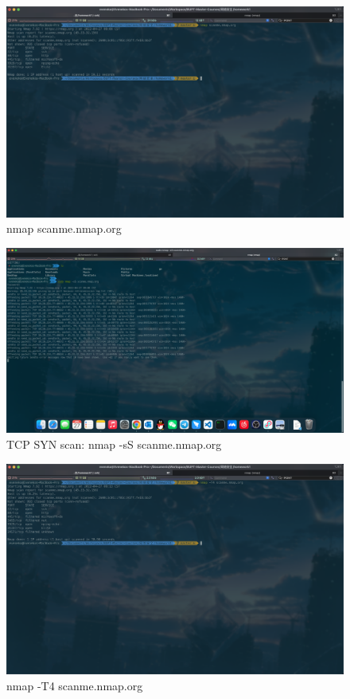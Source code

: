 \documentclass[onecolumn,oneside]{BUPTHomework}
\begin{document}
  \begin{figure}[h]
    \centering
    \includegraphics[width=1.00\textwidth]{img/fig3.png}
    \caption{nmap scanme.nmap.org}
    \label{fig3}
  \end{figure}

  \begin{figure}[h]
    \centering
    \includegraphics[width=1.00\textwidth]{img/fig4.png}
    \caption{TCP SYN scan: nmap -sS scanme.nmap.org}
    \label{fig4}
  \end{figure}

  \begin{figure}[h]
    \centering
    \includegraphics[width=1.00\textwidth]{img/fig5.png}
    \caption{nmap -T4 scanme.nmap.org}
    \label{fig5}
  \end{figure}
\end{document}
